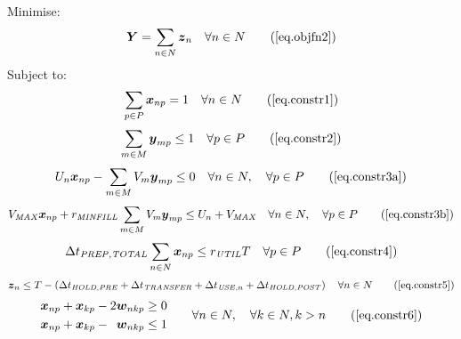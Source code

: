 Minimise:
\begin{equation}
    \boldsymbol{Y} = \sum_{n \in N} \boldsymbol{z}_{n} \quad \forall n \in N
    \tag{\ref{eq.objfn2}}
\end{equation}
Subject to:
\begin{equation}
    \sum_{p \in P} \boldsymbol{x}_{np} = 1 \quad \forall n \in N
    \tag{\ref{eq.constr1}}
\end{equation}
\begin{equation}
    \sum_{m \in M} \boldsymbol{y}_{mp} \le 1 \quad \forall p \in P
    \tag{\ref{eq.constr2}}
\end{equation}
\begin{equation}
    U_{n} \boldsymbol{x}_{np} - \sum_{m \in M} V_{m} \boldsymbol{y}_{mp} \le 0
    \quad \forall n \in N, \quad \forall p \in P
    \tag{\ref{eq.constr3a}}
\end{equation}
\begin{equation}
    V_{\mathit{MAX}} \boldsymbol{x}_{np} + r_{\mathit{MINFILL}} \sum_{m \in M}
    V_{m} \boldsymbol{y}_{mp} \le U_{n} + V_{\mathit{MAX}} \quad \forall n \in
    N, \quad \forall p \in P
    \tag{\ref{eq.constr3b}}
\end{equation}
\begin{equation}
    \Delta t_{\mathit{PREP,TOTAL}} \sum_{n \in N} \boldsymbol{x}_{np} \le 
    r_{\mathit{UTIL}} T \quad \forall p \in P
    \tag{\ref{eq.constr4}}
\end{equation}
\begin{equation}
    \boldsymbol{z}_{n} \le T - \left( \Delta t_{\mathit{HOLD,PRE}} +
    \Delta t_{\mathit{TRANSFER}} + \Delta t_{\mathit{USE},n} + \Delta
    t_{\mathit{HOLD,POST}} \right) \quad \forall n \in N
    \tag{\ref{eq.constr5}}
\end{equation}
\begin{equation}
    \begin{split}
        \begin{alignedat}{3}
            \boldsymbol{x}_{np} & {}+{} & \boldsymbol{x}_{kp} & {}-{} & 2
            \boldsymbol{w}_{nkp} & \ge 0\\
            \boldsymbol{x}_{np} & {}+{} & \boldsymbol{x}_{kp} & {}-{} &
            \boldsymbol{w}_{nkp} & \le 1\\
        \end{alignedat}
    \end{split}
    \quad\quad
    \begin{split}
        \forall n \in N, \quad \forall k \in N, k > n
    \end{split}
    \tag{\ref{eq.constr6}}
\end{equation}
